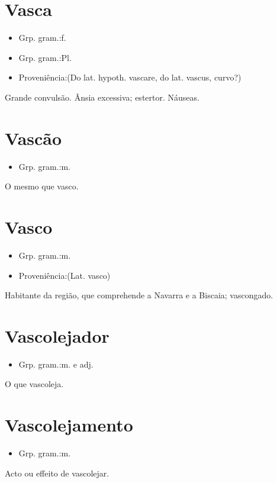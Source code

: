 \documentclass{article}
\begin{document}
\section{Vasca}
\begin{itemize}
\item {Grp. gram.:f.}
\end{itemize}
\begin{itemize}
\item {Grp. gram.:Pl.}
\end{itemize}
\begin{itemize}
\item {Proveniência:(Do lat. hypoth. \textunderscore vascare\textunderscore , do lat. \textunderscore vascus\textunderscore , curvo?)}
\end{itemize}
Grande convulsão.
Ânsia excessiva; estertor.
Náuseas.
\section{Vascão}
\begin{itemize}
\item {Grp. gram.:m.}
\end{itemize}
O mesmo que \textunderscore vasco\textunderscore .
\section{Vasco}
\begin{itemize}
\item {Grp. gram.:m.}
\end{itemize}
\begin{itemize}
\item {Proveniência:(Lat. \textunderscore vasco\textunderscore )}
\end{itemize}
Habitante da região, que comprehende a Navarra e a Biscaia; vascongado.
\section{Vascolejador}
\begin{itemize}
\item {Grp. gram.:m.  e  adj.}
\end{itemize}
O que vascoleja.
\section{Vascolejamento}
\begin{itemize}
\item {Grp. gram.:m.}
\end{itemize}
Acto ou effeito de vascolejar.
\end{document}
